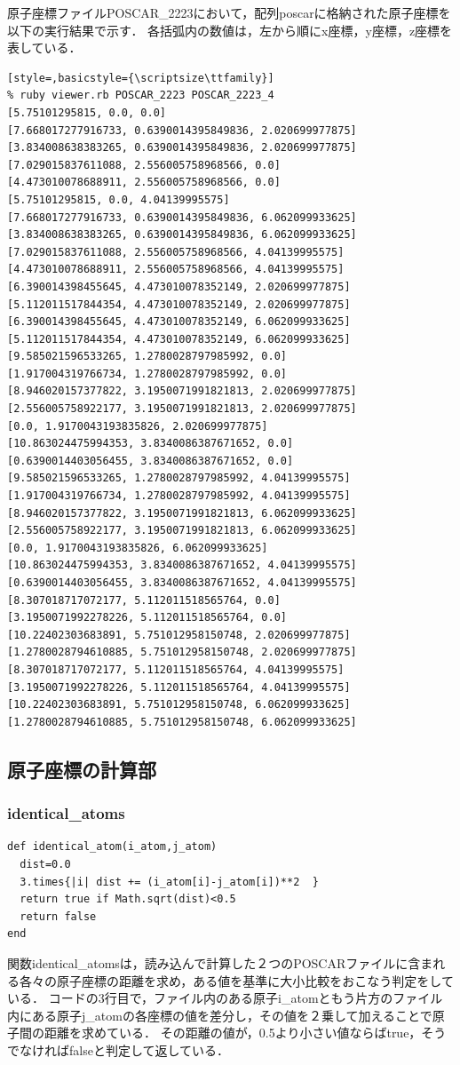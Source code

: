 原子座標ファイルPOSCAR\_2223において，配列poscarに格納された原子座標を以下の実行結果で示す．
各括弧内の数値は，左から順にx座標，y座標，z座標を表している．
\begin{lstlisting}[style=,basicstyle={\scriptsize\ttfamily}]
% ruby viewer.rb POSCAR_2223 POSCAR_2223_4
[5.75101295815, 0.0, 0.0]
[7.668017277916733, 0.6390014395849836, 2.020699977875]
[3.834008638383265, 0.6390014395849836, 2.020699977875]
[7.029015837611088, 2.556005758968566, 0.0]
[4.473010078688911, 2.556005758968566, 0.0]
[5.75101295815, 0.0, 4.04139995575]
[7.668017277916733, 0.6390014395849836, 6.062099933625]
[3.834008638383265, 0.6390014395849836, 6.062099933625]
[7.029015837611088, 2.556005758968566, 4.04139995575]
[4.473010078688911, 2.556005758968566, 4.04139995575]
[6.390014398455645, 4.473010078352149, 2.020699977875]
[5.112011517844354, 4.473010078352149, 2.020699977875]
[6.390014398455645, 4.473010078352149, 6.062099933625]
[5.112011517844354, 4.473010078352149, 6.062099933625]
[9.585021596533265, 1.2780028797985992, 0.0]
[1.917004319766734, 1.2780028797985992, 0.0]
[8.946020157377822, 3.1950071991821813, 2.020699977875]
[2.556005758922177, 3.1950071991821813, 2.020699977875]
[0.0, 1.9170043193835826, 2.020699977875]
[10.863024475994353, 3.8340086387671652, 0.0]
[0.6390014403056455, 3.8340086387671652, 0.0]
[9.585021596533265, 1.2780028797985992, 4.04139995575]
[1.917004319766734, 1.2780028797985992, 4.04139995575]
[8.946020157377822, 3.1950071991821813, 6.062099933625]
[2.556005758922177, 3.1950071991821813, 6.062099933625]
[0.0, 1.9170043193835826, 6.062099933625]
[10.863024475994353, 3.8340086387671652, 4.04139995575]
[0.6390014403056455, 3.8340086387671652, 4.04139995575]
[8.307018717072177, 5.112011518565764, 0.0]
[3.1950071992278226, 5.112011518565764, 0.0]
[10.22402303683891, 5.751012958150748, 2.020699977875]
[1.2780028794610885, 5.751012958150748, 2.020699977875]
[8.307018717072177, 5.112011518565764, 4.04139995575]
[3.1950071992278226, 5.112011518565764, 4.04139995575]
[10.22402303683891, 5.751012958150748, 6.062099933625]
[1.2780028794610885, 5.751012958150748, 6.062099933625]
\end{lstlisting}
\subsection{原子座標の計算部}
\subsubsection{identical\_atoms}\begin{lstlisting}[style=customRuby,basicstyle={\scriptsize\ttfamily}]
def identical_atom(i_atom,j_atom)
  dist=0.0
  3.times{|i| dist += (i_atom[i]-j_atom[i])**2  }
  return true if Math.sqrt(dist)<0.5
  return false
end
\end{lstlisting}
関数identical\_atomsは，読み込んで計算した２つのPOSCARファイルに含まれる各々の原子座標の距離を求め，ある値を基準に大小比較をおこなう判定をしている．
コードの3行目で，ファイル内のある原子i\_atomともう片方のファイル内にある原子j\_atomの各座標の値を差分し，その値を２乗して加えることで原子間の距離を求めている．
その距離の値が，0.5より小さい値ならばtrue，そうでなければfalseと判定して返している．

